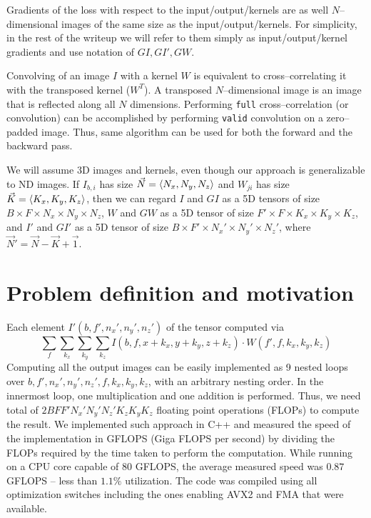   Gradients of the loss with respect to the input/output/kernels are
  as well $N$--dimensional images of the same size as the
  input/output/kernels.  For simplicity, in the rest of the writeup we
  will refer to them simply as input/output/kernel gradients and use
  notation of $GI, GI', GW$.

  Convolving of an image $I$ with a kernel $W$ is equivalent to
  cross--correlating it with the transposed kernel ($W^T$).  A
  transposed $N$--dimensional image is an image that is reflected
  along all $N$ dimensions.  Performing \texttt{full}
  cross--correlation (or convolution) can be accomplished by
  performing \texttt{valid} convolution on a zero--padded image.
  Thus, same algorithm can be used for both the forward and the
  backward pass.

  We will assume 3D images and kernels, even though our approach is
  generalizable to ND images.  If $I_{b,i}$ has size $\vec{N} =
  \langle N_x, N_y, N_z\rangle$ and $W_{ji}$ has size $\vec{K} =
  \langle K_x,K_y,K_z\rangle$, then we can regard $I$ and $GI$ as a 5D
  tensors of size $B \times F \times N_x \times N_y \times N_z$, $W$
  and $GW$ as a 5D tensor of size $F' \times F \times K_x \times K_y
  \times K_z$, and $I'$ and $GI'$ as a 5D tensor of size $B \times F'
  \times N_x' \times N_y' \times N_z'$, where $\vec{N}' = \vec{N} -
  \vec{K} + \vec{1}$.

\section{Problem definition and motivation}

  Each element $I'(b,f',n_x',n_y',n_z')$ of the tensor computed via
  {\footnotesize
  \[
  \sum_{f} \sum_{k_x} \sum_{k_y} \sum_{k_z}
  I(b,f,x+k_x,y+k_y,z+k_z) \cdot W(f',f,k_x,k_y,k_z)
  \]
  } Computing all the output images can be easily implemented as 9
  nested loops over $b,f',n_x',n_y',n_z',f,k_x,k_y,k_z$, with an
  arbitrary nesting order.  In the innermost loop, one multiplication
  and one addition is performed.  Thus, we need total of
  $2BFF'N_x'N_y'N_z'K_zK_yK_z$ floating point operations (FLOPs) to
  compute the result.  We implemented such approach in C++ and
  measured the speed of the implementation in GFLOPS (Giga FLOPS per
  second) by dividing the FLOPs required by the time taken to perform
  the computation.  While running on a CPU core capable of $80$
  GFLOPS, the average measured speed was $0.87$ GFLOPS -- less than
  $1.1\%$ utilization.  The code was compiled using all optimization
  switches including the ones enabling AVX2 and FMA that were
  available.

